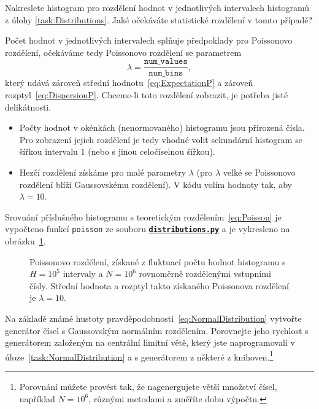\documentclass[a4paper,11pt,twoside]{article}
\def\code#1{\textnormal{\texttt{#1}}}
\def\ghfile#1#2{\textnormal{\textbf{\texttt{\href{https://github.com/PavelStransky/PCInPhysics/blob/main/#1#2}{#2}}}}}
\theoremstyle{red}
\theoremstyle{green}
\begin{document}
    \begin{solved}
        Nakreslete histogram pro rozdělení hodnot v jednotlivých intervalech histogramů z úlohy \ref{task:Distributions}.
        Jaké očekáváte statistické rozdělení v tomto případě?
    \end{solved}

    \begin{solution}
        Počet hodnot v jednotlivých intervalech splňuje předpoklady pro Poissonovo rozdělení, očekáváme tedy Poissonovo rozdělení se parametrem
        \begin{equation}
            \lambda=\frac{\mathtt{num\_values}}{\mathtt{num\_bins}},
        \end{equation}
        který udává zároveň střední hodnotu~\eqref{eq:ExpectationP} a zároveň rozptyl~\eqref{eq:DispersionP}.
        Chceme-li toto rozdělení zobrazit, je potřeba jisté delikátnosti.
        \begin{itemize}
            \item 
                Počty hodnot v okénkách (nenormovaného) histogramu jsou přirozená čísla.
                Pro zobrazení jejich rozdělení je tedy vhodné volit sekundární histogram se šířkou intervalu 1 (nebo s jinou celočíselnou šířkou).
            \item
                Hezčí rozdělení získáme pro malé parametry $\lambda$ (pro $\lambda$ velké se Poissonovo rozdělení blíží Gaussovskému rozdělení).
                V kódu volím hodnoty tak, aby $\lambda=10$.
        \end{itemize}
        Srovnání příslušného histogramu s teoretickým rozdělením~\eqref{eq:Poisson} je vypočteno funkcí \code{poisson} ze souboru \ghfile{python/histogram/}{distributions.py} a je vykresleno na obrázku~\ref{fig:Poisson}.

        \begin{figure}[!htb]
            \centering{}
            \caption{
                \protect\small
                Poissonovo rozdělení, získané z fluktuací počtu hodnot histogramu s $H=10^{5}$ intervaly a $N=10^{6}$ rovnoměrně rozdělenými vstupními čísly.
                Střední hodnota a rozptyl takto získaného Poissonova rozdělení je $\lambda=10$. 
            }
            \label{fig:Poisson}
        \end{figure}
    \end{solution}
    
    \begin{solved}\label{task:GeneratorTime}
        Na základě známé hustoty pravděpodobnosti~\eqref{eq:NormalDistribution} vytvořte generátor čísel s Gaussovským normálním rozdělením.
        Porovnejte jeho rychlost s generátorem založeným na centrální limitní větě, který jste naprogramovali v úloze~\ref{task:NormalDistribution} a s generátorem z některé z knihoven.\footnote{Porovnání můžete provést tak, že nagenergujete větší množství čísel, například $N=10^{6}$, různými metodami a změříte dobu výpočtu.} 
    \end{solved}
\end{document}
